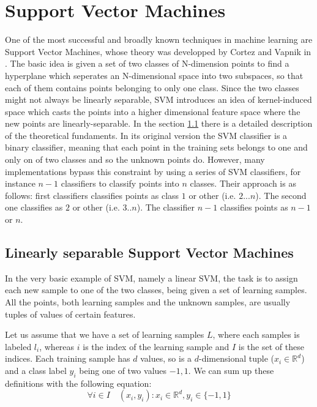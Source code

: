 
\section{Support Vector Machines}\label{sec:svm}
One of the most successful and broadly known techniques in machine learning are Support Vector Machines, whose theory was developped by Cortez and Vapnik in \cite{C.Cortes1995}. The basic idea is given a set of two classes of N-dimension points to find a hyperplane which seperates an N-dimensional space into two subspaces, so that each of them contains points belonging to only one class. Since the two classes might not always be linearly separable, SVM introduces an idea of kernel-induced space which casts the points into a higher dimensional feature space where the new points are linearly-separable. In the section \ref{subsec:linear_svm} there is a detailed description of the theoretical fundaments. In its original version the SVM classifier is a binary classifier, meaning that each point in the training sets belongs to one and only on of two classes and so the unknown points do. However, many implementations bypass this constraint by using a series of SVM classifiers, for instance $n-1$ classifiers to classify points into $n$ classes. Their approach is as follows: first classifiers classifies points as class $1$ or other (i.e. $2...n$). The second one classifies as $2$ or other (i.e. $3..n$). The classifier $n-1$ classifies points as $n-1$ or $n$.

\subsection{Linearly separable Support Vector Machines}
\label{subsec:linear_svm}
In the very basic example of SVM, namely a linear SVM, the task is to assign each new sample to one of the two classes, being given a set of learning samples. All the points, both learning samples and the unknown samples, are usually tuples of values of certain features.

Let us assume that we have a set of learning samples $L$, where each samples is labeled $l_i$, whereas $i$ is the index of the learning sample and $I$ is the set of these indices. Each training sample has $d$ values, so is a $d$-dimensional tuple ($x_i \in \mathbb{R}^d$) and a class label $y_i$ being one of two values ${-1, 1}$. We can sum up these definitions with the following equation:
\begin{equation}
\forall{i \in I} \quad \left(x_i, y_i\right) : x_i \in \mathbb{R}^d, y_i \in \{-1, 1\}
\end{equation} 

